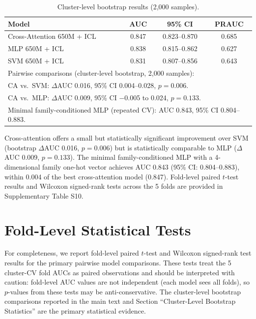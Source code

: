 \documentclass[11pt,a4paper]{article}
\begin{document}
\begin{table}[h!]
\centering
\caption{Cluster-level bootstrap results (2,000 samples).}
\label{tab:bootstrap}
\begin{tabular}{lccc}
\toprule
Model & AUC & 95\% CI & PRAUC \\
\midrule
Cross-Attention 650M + ICL & 0.847 & 0.823--0.870 & 0.685 \\
MLP 650M + ICL            & 0.838 & 0.815--0.862 & 0.627 \\
SVM 650M + ICL            & 0.831 & 0.807--0.856 & 0.643 \\
\midrule
\multicolumn{4}{l}{\small Pairwise comparisons (cluster-level bootstrap, 2,000 samples):} \\
\multicolumn{4}{l}{\small CA vs.\ SVM: $\Delta$AUC 0.016, 95\% CI 0.004--0.028, $p = 0.006$.} \\
\multicolumn{4}{l}{\small CA vs.\ MLP: $\Delta$AUC 0.009, 95\% CI $-$0.005 to 0.024, $p = 0.133$.} \\
\multicolumn{4}{l}{\small Minimal family-conditioned MLP (repeated CV): AUC 0.843, 95\% CI 0.804--0.883.} \\
\end{tabular}
\end{table}

Cross-attention offers a small but statistically significant improvement over SVM (bootstrap $\Delta$AUC 0.016, $p = 0.006$) but is statistically comparable to MLP ($\Delta$AUC 0.009, $p = 0.133$). The minimal family-conditioned MLP with a 4-dimensional family one-hot vector achieves AUC 0.843 (95\% CI: 0.804--0.883), within 0.004 of the best cross-attention model (0.847). Fold-level paired $t$-test results and Wilcoxon signed-rank tests across the 5 folds are provided in Supplementary Table S10.

\section{Fold-Level Statistical Tests}

For completeness, we report fold-level paired $t$-test and Wilcoxon signed-rank test results for the primary pairwise model comparisons. These tests treat the 5 cluster-CV fold AUCs as paired observations and should be interpreted with caution: fold-level AUC values are not independent (each model sees all folds), so $p$-values from these tests may be anti-conservative. The cluster-level bootstrap comparisons reported in the main text and Section ``Cluster-Level Bootstrap Statistics'' are the primary statistical evidence.
\end{document}
